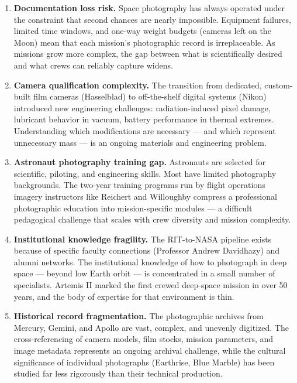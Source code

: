 \documentclass[11pt,letterpaper]{article}
\begin{document}
\begin{enumerate}
  \item \textbf{Documentation loss risk.} Space photography has always operated under the constraint that second chances are nearly impossible. Equipment failures, limited time windows, and one-way weight budgets (cameras left on the Moon) mean that each mission's photographic record is irreplaceable. As missions grow more complex, the gap between what is scientifically desired and what crews can reliably capture widens.

  \item \textbf{Camera qualification complexity.} The transition from dedicated, custom-built film cameras (Hasselblad) to off-the-shelf digital systems (Nikon) introduced new engineering challenges: radiation-induced pixel damage, lubricant behavior in vacuum, battery performance in thermal extremes. Understanding which modifications are necessary --- and which represent unnecessary mass --- is an ongoing materials and engineering problem.

  \item \textbf{Astronaut photography training gap.} Astronauts are selected for scientific, piloting, and engineering skills. Most have limited photography backgrounds. The two-year training programs run by flight operations imagery instructors like Reichert and Willoughby compress a professional photographic education into mission-specific modules --- a difficult pedagogical challenge that scales with crew diversity and mission complexity.

  \item \textbf{Institutional knowledge fragility.} The RIT-to-NASA pipeline exists because of specific faculty connections (Professor Andrew Davidhazy) and alumni networks. The institutional knowledge of how to photograph in deep space --- beyond low Earth orbit --- is concentrated in a small number of specialists. Artemis II marked the first crewed deep-space mission in over 50 years, and the body of expertise for that environment is thin.

  \item \textbf{Historical record fragmentation.} The photographic archives from Mercury, Gemini, and Apollo are vast, complex, and unevenly digitized. The cross-referencing of camera models, film stocks, mission parameters, and image metadata represents an ongoing archival challenge, while the cultural significance of individual photographs (Earthrise, Blue Marble) has been studied far less rigorously than their technical production.
\end{enumerate}
\end{document}
